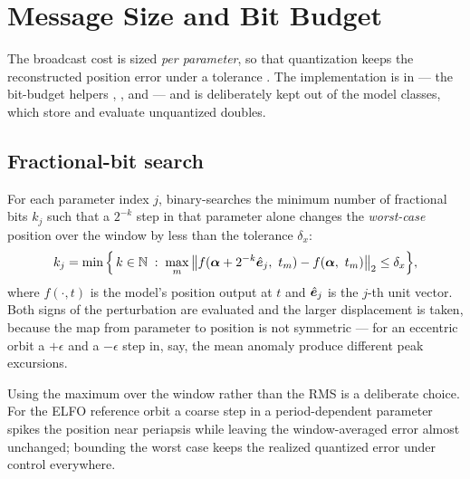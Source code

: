 \section{Message Size and Bit Budget}
\label{sec:eph-bits}

The broadcast cost is sized \emph{per parameter}, so that quantization keeps
the reconstructed position error under a tolerance
\citep[\S7.3.2, Eqs.~7.8--7.12]{iiyama2026thesis}. The implementation is in
 --- the
 bit-budget helpers ,
, and  --- and is deliberately kept out
of the model classes, which store and evaluate unquantized doubles.

\subsection{Fractional-bit search}

For each parameter index $j$,  binary-searches the
minimum number of fractional bits $k_j$ such that a $2^{-k}$ step in that
parameter alone changes the \emph{worst-case} position over the window by less
than the tolerance $\delta_x$:
\begin{equation}
  \label{eq:eph-bits-k}
  k_j = \min\Big\{\,k \in \mathbb{N} \;:\;
    \max_{m}\big\lVert f(\bm{\alpha} + 2^{-k}\hat{\bm{e}}_j,\ t_m)
                     - f(\bm{\alpha},\ t_m)\big\rVert_2 \le \delta_x \Big\},
\end{equation}
where $f(\cdot,t)$ is the model's position output at $t$ and $\hat{\bm{e}}_j$ is
the $j$-th unit vector. Both signs of the perturbation are evaluated and the
larger displacement is taken, because the map from parameter to position is
not symmetric --- for an eccentric orbit a $+\epsilon$ and a $-\epsilon$ step
in, say, the mean anomaly produce different peak excursions.

Using the maximum over the window rather than the RMS is a deliberate choice.
For the ELFO reference orbit a coarse step in a period-dependent parameter
spikes the position near periapsis while leaving the window-averaged error
almost unchanged; bounding the worst case keeps the realized quantized error
under control everywhere.

